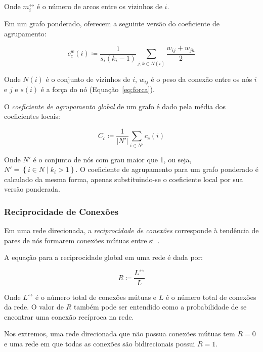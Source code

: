 \documentclass[12pt,a4paper]{article}
\theoremstyle{hypo}
\newcommand{\defn}{\coloneqq} %
\newcommand{\linkboth}[1]{#1^\leftrightarrow} %
\newcommand{\weighted}[1]{#1^w} %
\begin{document}
Onde $\linkboth{m}_i$ é o número de arcos entre os vizinhos de $i$.

Em um grafo ponderado,  oferecem a seguinte versão do coeficiente de agrupamento:

\begin{equation}
\weighted{c}_c(i) \defn \frac{1}{s_i(k_i - 1)} \sum_{j,k \in N(i)} \frac{w_{ij} + w_{jh}}{2}
\end{equation}

Onde $N(i)$ é o conjunto de vizinhos de $i$, $w_{ij}$ é o peso da conexão entre os nós $i$ e $j$ e $s(i)$ é a força do nó (Equação~\ref{eq:forca}).

O \textit{coeficiente de agrupamento global} de um grafo é dado pela média dos coeficientes locais:

\begin{equation}
C_c \defn \frac{1}{|N'|} \sum_{i \in N'} c_c(i)
\end{equation}

Onde $N'$ é o conjunto de nós com grau maior que 1, ou seja, $N' = \left\lbrace i \in N \mid k_i > 1 \right\rbrace$. O coeficiente de agrupamento para um grafo ponderado é calculado da mesma forma, apenas substituindo-se o coeficiente local por sua versão ponderada.

\subsubsection{Reciprocidade de Conexões} \label{sec:reciprocidade}

Em uma rede direcionada, a \textit{reciprocidade de conexões} corresponde à tendência de pares de nós formarem conexões mútuas entre si~\cite{Garlaschelli2004-db}.

A equação para a reciprocidade global em uma rede é dada por:

\begin{equation} \label{eq:reciprocidade}
R \defn \frac{\linkboth{L}}{L}
\end{equation}

Onde $\linkboth{L}$ é o número total de conexões mútuas e $L$ é o número total de conexões da rede. O valor de $R$ também pode ser entendido como a probabilidade de se encontrar uma conexão recíproca na rede.

Nos extremos, uma rede direcionada que não possua conexões mútuas tem $R = 0$ e uma rede em que todas as conexões são bidirecionais possui $R = 1$.
\end{document}
